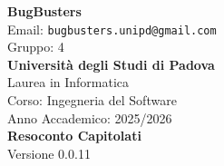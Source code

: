 \documentclass[a4paper,11pt]{article}
\newcommand{\CurrentVersion}{0.0.11} %
\begin{document}
\pagestyle{fancy}
\fancyhf{} %


\fancyfoot[R]{ \nouppercase{\rightmark}} %


\renewcommand{\headrulewidth}{0pt}  %
\renewcommand{\footrulewidth}{0pt}  %


\begin{center}
  \thispagestyle{empty}
  {\Large\bfseries BugBusters}\\[0.3cm]
  {\small\color{darkgray} Email: \texttt{bugbusters.unipd@gmail.com}} \\[0.1cm]
  {\small\color{darkgray} Gruppo: 4} \\[0.5cm]

  {\large\bfseries Università degli Studi di Padova}\\[0.3cm]
  {\small Laurea in Informatica}\\[0.2cm]
  {\small Corso: Ingegneria del Software}\\[0.2cm]
  {\small Anno Accademico: 2025/2026}\\[0.8cm]

  {\Huge\bfseries\color{primaryblue} Resoconto Capitolati}\\[0.8cm]
  {\Large\color{secondaryblue}Versione \CurrentVersion}\\[0.8cm]
\end{center}
\end{document}
